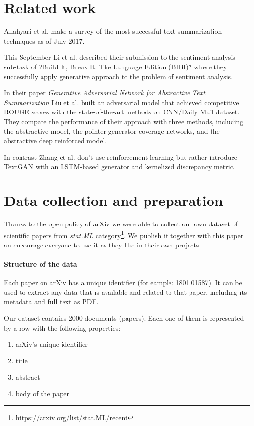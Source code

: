 \documentclass[sigplan]{acmart}
\begin{document}
\section{Related work}

Allahyari et al.\cite{allahyari-17} make a survey of the most successful text summarization techniques as of July 2017.

This September Li et al. \cite{li-cohn-17} described their submission to the sentiment analysis sub-task of ?Build It, Break It: The Language Edition (BIBI)? where they successfully apply generative approach to the problem of sentiment analysis.

In their paper \textit{Generative Adversarial Network for Abstractive Text Summarization} Liu et al.\cite{liu-17} built an adversarial model that achieved competitive ROUGE scores with the state-of-the-art methods on CNN/Daily Mail dataset. They compare the performance of their approach with three methods, including the abstractive model, the pointer-generator coverage networks, and the abstractive deep reinforced model.

In contrast Zhang et al.\cite{zhang-17} don't use reinforcement learning but rather introduce TextGAN with an LSTM-based generator and kernelized discrepancy metric.

\section{Data collection and preparation}
\label{sec:data}

Thanks to the open policy of arXiv we were able to collect our own dataset of scientific papers from \textit{stat.ML} category\footnote{\url{https://arxiv.org/list/stat.ML/recent}}. We publish it together with this paper an encourage everyone to use it as they like in their own projects.

\paragraph{Structure of the data} Each paper on arXiv has a unique identifier (for eample: 1801.01587). It can be used to extract any data that is available and related to that paper, including its metadata and full text as PDF.

Our dataset contains 2000 documents (papers). Each one of them is represented by a row with the following properties:

\begin{enumerate}
  \item arXiv's unique identifier
  \item title
  \item abstract
  \item body of the paper
\end{enumerate}
\end{document}
